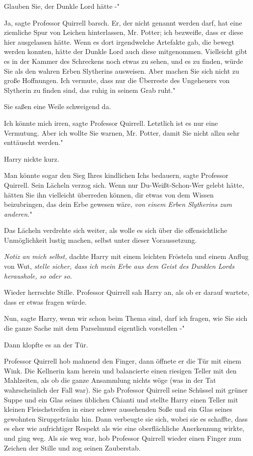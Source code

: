\glqq{}Glauben Sie, der Dunkle Lord hätte -"

\glqq{}Ja\grqq{}, sagte Professor Quirrell barsch. \glqq{}Er, der nicht genannt
werden darf, hat eine ziemliche Spur von Leichen hinterlassen, Mr. Potter; ich
bezweifle, dass er diese hier ausgelassen hätte. Wenn es dort irgendwelche
Artefakte gab, die bewegt werden konnten, hätte der Dunkle Lord auch diese
mitgenommen. Vielleicht gibt es in der Kammer des Schreckens noch etwas zu
sehen, und es zu finden, würde Sie als den wahren Erben Slytherins ausweisen.
Aber machen Sie sich nicht zu große Hoffnungen. Ich vermute, dass nur die
Überreste des Ungeheuers von Slytherin zu finden sind, das ruhig in seinem Grab
ruht."

Sie saßen eine Weile schweigend da.

\glqq{}Ich könnte mich irren\grqq{}, sagte Professor Quirrell. \glqq{}Letztlich
ist es nur eine Vermutung. Aber ich wollte Sie warnen, Mr. Potter, damit Sie
nicht allzu sehr enttäuscht werden."

Harry nickte kurz.

\glqq{}Man könnte sogar den Sieg Ihres kindlichen Ichs bedauern\grqq{}, sagte
Professor Quirrell. Sein Lächeln verzog sich. \glqq{}Wenn nur Du-Weißt-Schon-Wer
gelebt hätte, hätten Sie ihn vielleicht überreden können, dir etwas von dem
Wissen beizubringen, das dein Erbe gewesen wäre, \emph{von einem Erben
Slytherins zum anderen.}"

Das Lächeln verdrehte sich weiter, als wolle es sich über die offensichtliche
Unmöglichkeit lustig machen, selbst unter dieser Voraussetzung.

\emph{Notiz an mich selbst,} dachte Harry mit einem leichten Frösteln und einem
Anflug von Wut,\emph{ stelle sicher, dass ich mein Erbe aus dem Geist des
Dunklen Lords heraushole, so oder so.}

Wieder herrschte Stille. Professor Quirrell sah Harry an, als ob er darauf
wartete, dass er etwas fragen würde.

\glqq{}Nun\grqq{}, sagte Harry, \glqq{}wenn wir schon beim Thema sind, darf ich
fragen, wie Sie sich die ganze Sache mit dem Parselmund eigentlich vorstellen -"

Dann klopfte es an der Tür.

Professor Quirrell hob mahnend den Finger, dann öffnete er die Tür mit einem
Wink. Die Kellnerin kam herein und balancierte einen riesigen Teller mit den
Mahlzeiten, als ob die ganze Ansammlung nichts wöge (was in der Tat
wahrscheinlich der Fall war). Sie gab Professor Quirrell seine Schüssel mit
grüner Suppe und ein Glas seines üblichen Chianti und stellte Harry einen Teller
mit kleinen Fleischstreifen in einer schwer aussehenden Soße und ein Glas seines
gewohnten Sirupgetränks hin. Dann verbeugte sie sich, wobei sie es schaffte,
dass es eher wie aufrichtiger Respekt als wie eine oberflächliche Anerkennung
wirkte, und ging weg. Als sie weg war, hob Professor Quirrell wieder einen
Finger zum Zeichen der Stille und zog seinen Zauberstab.

